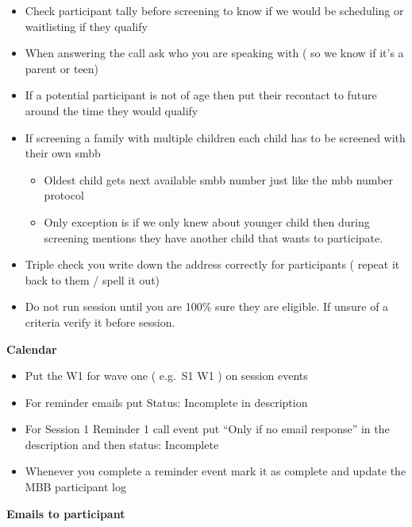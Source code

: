 \documentclass[]{book}
\providecommand{\tightlist}{%
  \setlength{\itemsep}{0pt}\setlength{\parskip}{0pt}}
\begin{document}
\begin{itemize}
\tightlist
\item
  Check participant tally before screening to know if we would be scheduling or waitlisting if they qualify
\item
  When answering the call ask who you are speaking with ( so we know if it's a parent or teen)
\item
  If a potential participant is not of age then put their recontact to future around the time they would qualify
\item
  If screening a family with multiple children each child has to be screened with their own smbb

  \begin{itemize}
  \tightlist
  \item
    Oldest child gets next available smbb number just like the mbb number protocol
  \item
    Only exception is if we only knew about younger child then during screening mentions they have another child that wants to participate.
  \end{itemize}
\item
  Triple check you write down the address correctly for participants ( repeat it back to them / spell it out)
\item
  Do not run session until you are 100\% sure they are eligible. If unsure of a criteria verify it before session.
\end{itemize}

\textbf{Calendar}

\begin{itemize}
\tightlist
\item
  Put the W1 for wave one ( e.g.~S1 W1 ) on session events
\item
  For reminder emails put Status: Incomplete in description
\item
  For Session 1 Reminder 1 call event put ``Only if no email response'' in the description and then status: Incomplete
\item
  Whenever you complete a reminder event mark it as complete and update the MBB participant log
\end{itemize}

\textbf{Emails to participant}
\end{document}
